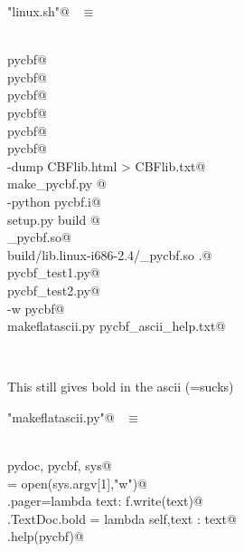 \documentclass[10pt,a4paper,twoside,notitlepage]{article}
\begin{document}
\begin{flushleft} \small
\begin{minipage}{\linewidth} \label{scrap15}
\verb@"linux.sh"@\nobreak\ {\footnotesize {} }$\equiv$
\vspace{-1ex}
\begin{list}{}{} \item
\mbox{}\verb@@\\
\mbox{}\verb@nuweb pycbf@\\
\mbox{}\verb@latex pycbf@\\
\mbox{}\verb@nuweb pycbf@\\
\mbox{}\verb@latex pycbf@\\
\mbox{}\verb@dvipdfm pycbf@\\
\mbox{}\verb@nuweb pycbf@\\
\mbox{}\verb@lynx -dump CBFlib.html > CBFlib.txt@\\
\mbox{}\verb@python make_pycbf.py @\\
\mbox{}\verb@swig -python pycbf.i@\\
\mbox{}\verb@python setup.py build @\\
\mbox{}\verb@rm _pycbf.so@\\
\mbox{}\verb@cp build/lib.linux-i686-2.4/_pycbf.so .@\\
\mbox{}\verb@python pycbf_test1.py@\\
\mbox{}\verb@python pycbf_test2.py@\\
\mbox{}\verb@pydoc -w pycbf@\\
\mbox{}\verb@python makeflatascii.py pycbf_ascii_help.txt@\\
\mbox{}\verb@@{\NWsep}
\end{list}
\vspace{-2ex}
\end{minipage}\\[4ex]
\end{flushleft}
This still gives bold in the ascii (=sucks)

\begin{flushleft} \small \label{scrap16}
\verb@"makeflatascii.py"@\nobreak\ {\footnotesize {} }$\equiv$
\vspace{-1ex}
\begin{list}{}{} \item
\mbox{}\verb@@\\
\mbox{}\verb@import pydoc, pycbf, sys@\\
\mbox{}\verb@f = open(sys.argv[1],"w")@\\
\mbox{}\verb@pydoc.pager=lambda text: f.write(text)@\\
\mbox{}\verb@pydoc.TextDoc.bold = lambda self,text : text@\\
\mbox{}\verb@pydoc.help(pycbf)@\\
\mbox{}\verb@@{\NWsep}
\end{list}
\vspace{-2ex}
\end{flushleft}
\end{document}
